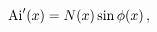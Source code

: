 \[\mathop{\mathrm{Ai}\/}\nolimits'\!\left(x\right)=\mathop{N\/}\nolimits\!\left(%
x\right)\mathop{\sin\/}\nolimits\mathop{\phi\/}\nolimits\!\left(x\right),\]